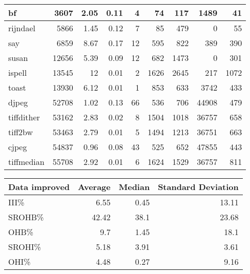 \begin{tabular}{l|r|r|r|r|r|r|r|r}
\hline
 bf              &           3607 &     2.05 &   0.11 &    4 &     74 &          117 &  1489 &    41 \\
\hline
 rijndael        &           5866 &     1.45 &   0.12 &    7 &     85 &          479 &     0 &    55 \\
\hline
 say             &           6859 &     8.67 &   0.17 &   12 &    595 &          822 &   389 &   390 \\
\hline
 susan           &          12656 &     5.39 &   0.09 &   12 &    682 &         1473 &     0 &   301 \\
\hline
 ispell          &          13545 &    12    &   0.01 &    2 &   1626 &         2645 &   217 &  1072 \\
\hline
 toast           &          13930 &     6.12 &   0.01 &    1 &    853 &          633 &  3742 &   433 \\
\hline
 djpeg           &          52708 &     1.02 &   0.13 &   66 &    536 &          706 & 44908 &   479 \\
\hline
 tiffdither      &          53162 &     2.83 &   0.02 &    8 &   1504 &         1018 & 36757 &   658 \\
\hline
 tiff2bw         &          53463 &     2.79 &   0.01 &    5 &   1494 &         1213 & 36751 &   663 \\
\hline
 cjpeg           &          54837 &     0.96 &   0.08 &   43 &    525 &          652 & 47855 &   443 \\
\hline
 tiffmedian      &          55708 &     2.92 &   0.01 &    6 &   1624 &         1529 & 36757 &   811 \\
\hline
\end{tabular}\begin{tabular}{lrrr}
\hline
 Data improved   &   Average &   Median &   Standard Deviation \\
\hline
 III\%            &      6.55 &     0.45 &                13.11 \\
 SROHB\%          &     42.42 &    38.1  &                23.68 \\
 OHB\%            &      9.7  &     1.45 &                18.1  \\
 SROHI\%          &      5.18 &     3.91 &                 3.61 \\
 OHI\%            &      4.48 &     0.27 &                 9.16 \\
\hline
\end{tabular}
